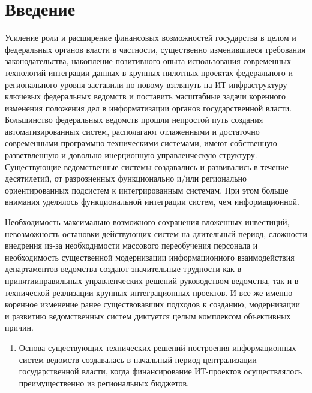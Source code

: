       \begin{multicols}{2}

      \label{st\stat}

\section{Введение}

      Усиление роли и расширение финансовых возможностей государства в целом и 
федеральных органов власти в частности, существенно из\-ме\-нив\-шиеся требования 
законодательства, накопление позитивного опыта использования современных технологий 
интеграции данных в крупных пилотных проектах федерального и регионального уровня 
заставили по-новому взглянуть на ИТ-ин\-фра\-струк\-ту\-ру ключевых федеральных ведомств и 
поставить масштабные задачи коренного изменения положения дел в информатизации органов 
государственной власти. Большинство федеральных ведомств прошли непростой путь 
создания автоматизированных систем, располагают отлаженными и достаточно современными 
программно-техническими системами, имеют собственную разветвленную и довольно 
инерционную управленческую структуру. Существующие ведомственные системы 
создавались и развивались в течение десятилетий, от разрозненных функционально и/или 
регионально ориентированных подсистем к интегрированным системам. При этом больше 
внимания уделялось функциональной интеграции систем, чем информационной.
      
       Необходимость максимально возможного сохранения вложенных инвестиций, 
невозможность остановки действующих систем на длительный период, сложности внедрения 
из-за необходимости массового переобучения персонала и необходимость существенной 
модернизации информационного взаимодействия департаментов ведомства создают 
значительные трудности как в принятии\linebreak правильных управленческих решений руководством 
ведомства, так и в технической реализации крупных интеграционных проектов. И все же 
именно коренное изменение ранее существовавших подходов к созданию, модернизации и 
развитию ведомственных систем диктуется целым комплексом объективных причин. 
      \begin{enumerate}[1.]
\item Основа существующих технических решений построения информационных систем 
ведомств создавалась в начальный период централизации государственной власти, когда 
финансирование ИТ-про\-ек\-тов осуществлялось преимущественно из региональных бюджетов.
      

\end{enumerate}
\end{multicols}
